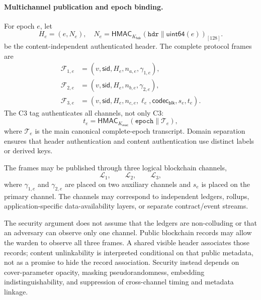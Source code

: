 \documentclass[journal]{IEEEtran}
\theoremstyle{definition}
\theoremstyle{game}
\begin{document}
\paragraph{Multichannel publication and epoch binding.}
For epoch $e$, let
\begin{equation}
\label{eq:blockchain_header}
H_e=(e,N_e),\quad N_e=\mathsf{HMAC}_{K_{\mathsf{hdr}}}(\texttt{hdr}\parallel\mathsf{uint64}(e))_{[128]}.
\end{equation}
be the content-independent authenticated header. The complete protocol frames are
\begin{align}
\mathcal F_{1,e}&=(v,\mathsf{sid},H_e,n_{a,e},\gamma_{1,e}),\label{eq:blockchain_frame1}\\
\mathcal F_{2,e}&=(v,\mathsf{sid},H_e,n_{b,e},\gamma_{2,e}),\label{eq:blockchain_frame2}\\
\mathcal F_{3,e}&=(v,\mathsf{sid},H_e,n_{c,e},\ell_e,\mathsf{codec}_{\mathsf{blk}},s_e,t_e).
\label{eq:blockchain_frame3}
\end{align}
The C3 tag authenticates all channels, not only C3:
\begin{equation}\label{eq:blockchain_mac}
t_e=\mathsf{HMAC}_{K_{\mathsf{mac}}}(\texttt{epoch}\parallel\mathcal T_e),
\end{equation}
where $\mathcal T_e$ is the main canonical complete-epoch transcript.
Domain separation ensures that header authentication and
content authentication use distinct labels or derived keys.

The frames may be published through three logical blockchain
channels,
\begin{equation}
\mathcal{L}_1,\qquad
\mathcal{L}_2,\qquad
\mathcal{L}_3,
\end{equation}
where $\gamma_{1,e}$ and $\gamma_{2,e}$ are placed on two
auxiliary channels and $s_e$ is placed on the primary channel.
The channels may correspond to independent ledgers, rollups,
application-specific data-availability layers, or separate
contract/event streams.

The security argument does not assume that the ledgers are
non-colluding or that an adversary can observe only one channel.
Public blockchain records may allow the warden to observe all
three frames. A shared visible header associates those records; content
unlinkability is interpreted conditional on that public metadata, not as
a promise to hide the record association. Security instead depends on cover-parameter
opacity, masking pseudorandomness, embedding indistinguishability,
and suppression of cross-channel timing and metadata linkage.
\end{document}
